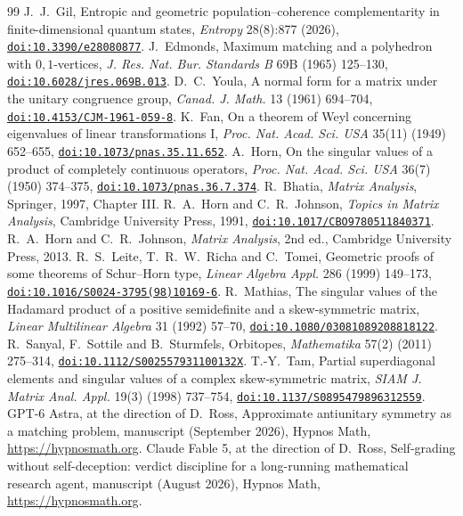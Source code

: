 \documentclass[11pt]{article}
\begin{document}
\begin{thebibliography}{99}
 J.~J.~Gil, Entropic and geometric population--coherence
complementarity in finite-dimensional quantum states, \emph{Entropy} 28(8):877 (2026),
\href{https://doi.org/10.3390/e28080877}{\nolinkurl{doi:10.3390/e28080877}}.
 J.~Edmonds, Maximum matching and a polyhedron with $0,1$-vertices,
\emph{J. Res. Nat. Bur. Standards B} 69B (1965) 125--130,
\href{https://doi.org/10.6028/jres.069B.013}{\nolinkurl{doi:10.6028/jres.069B.013}}.
 D.~C.~Youla, A normal form for a matrix under the unitary congruence group,
\emph{Canad. J. Math.} 13 (1961) 694--704,
\href{https://doi.org/10.4153/CJM-1961-059-8}{\nolinkurl{doi:10.4153/CJM-1961-059-8}}.
 K.~Fan, On a theorem of Weyl concerning eigenvalues of linear transformations I,
\emph{Proc. Nat. Acad. Sci. USA} 35(11) (1949) 652--655,
\href{https://doi.org/10.1073/pnas.35.11.652}{\nolinkurl{doi:10.1073/pnas.35.11.652}}.
 A.~Horn, On the singular values of a product of completely
continuous operators, \emph{Proc. Nat. Acad. Sci. USA} 36(7) (1950) 374--375,
\href{https://doi.org/10.1073/pnas.36.7.374}{\nolinkurl{doi:10.1073/pnas.36.7.374}}.
 R.~Bhatia, \emph{Matrix Analysis}, Springer, 1997, Chapter III.
 R.~A.~Horn and C.~R.~Johnson, \emph{Topics in Matrix Analysis},
Cambridge University Press, 1991,
\href{https://doi.org/10.1017/CBO9780511840371}{\nolinkurl{doi:10.1017/CBO9780511840371}}.
 R.~A.~Horn and C.~R.~Johnson, \emph{Matrix Analysis}, 2nd ed.,
Cambridge University Press, 2013.
 R.~S.~Leite, T.~R.~W.~Richa and C.~Tomei, Geometric proofs of some
theorems of Schur--Horn type, \emph{Linear Algebra Appl.} 286 (1999) 149--173,
\href{https://doi.org/10.1016/S0024-3795(98)10169-6}{\nolinkurl{doi:10.1016/S0024-3795(98)10169-6}}.
 R.~Mathias, The singular values of the Hadamard product of a
positive semidefinite and a skew-symmetric matrix, \emph{Linear Multilinear
Algebra} 31 (1992) 57--70, \href{https://doi.org/10.1080/03081089208818122}{\nolinkurl{doi:10.1080/03081089208818122}}.
 R.~Sanyal, F.~Sottile and B.~Sturmfels, Orbitopes,
\emph{Mathematika} 57(2) (2011) 275--314,
\href{https://doi.org/10.1112/S002557931100132X}{\nolinkurl{doi:10.1112/S002557931100132X}}.
 T.-Y.~Tam, Partial superdiagonal elements and singular values of a complex
skew-symmetric matrix, \emph{SIAM J. Matrix Anal. Appl.} 19(3) (1998) 737--754,
\href{https://doi.org/10.1137/S0895479896312559}{\nolinkurl{doi:10.1137/S0895479896312559}}.
 GPT-6 Astra, at the direction of D.~Ross, Approximate antiunitary
symmetry as a matching problem, manuscript (September 2026), Hypnos Math,
\url{https://hypnosmath.org}.
 Claude Fable 5, at the direction of D.~Ross, Self-grading without self-deception: verdict discipline for a long-running mathematical research agent, manuscript (August 2026), Hypnos Math, \url{https://hypnosmath.org}.
\end{thebibliography}
\end{document}
